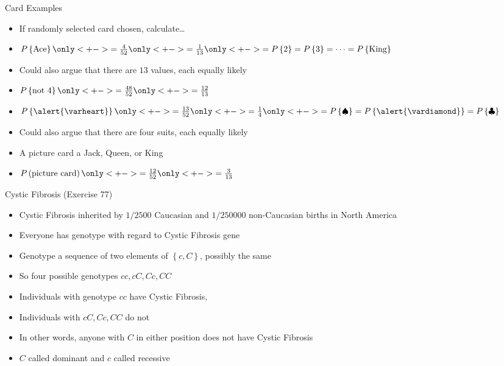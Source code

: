 \documentclass[handout]{beamer}
\theoremstyle{definition}
\begin{document}
\begin{frame}{Card Examples}
\begin{itemize}
\item If randomly selected card chosen, calculate\dots
\item $P\left\{\text{Ace}\right\}\only<+->{=\frac{4}{52}}
\only<+->{=\frac{1}{13}}
\only<+->{=P\left\{2\right\}=P\left\{3\right\}
=\cdots=P\left\{\text{King}\right\}}$
\item Could also argue that there are $13$ values, each equally likely
\item $P\left\{\text{not $4$}\right\}\only<+->{=\frac{48}{52}
\only<+->{=\frac{12}{13}}}$
\item $P\left\{\alert{\varheart}\right\}
\only<+->{=\frac{13}{52}}\only<+->{=\frac{1}{4}}
\only<+->{=P\left\{\spadesuit\right\}
=P\left\{\alert{\vardiamond}\right\}
=P\left\{\clubsuit\right\}}$
\item Could also argue that there are four suits, each equally likely
\item A \alert{picture card} a Jack, Queen, or King
\item $P\left(\text{picture card}\right)
\only<+->{=\frac{12}{52}}
\only<+->{=\frac{3}{13}}$
\end{itemize}
\end{frame}

\begin{frame}{Cystic Fibrosis (Exercise 77)}
\begin{itemize}
\item Cystic Fibrosis inherited by $1/2500$ Caucasian
and $1/250000$ non-Caucasian births in North America
\item Everyone has \alert{genotype}
with regard to Cystic Fibrosis gene
\item \alert{Genotype} a sequence of two elements of
$\left\{c,C\right\}$, possibly the same
\item So four possible genotypes $cc,cC,Cc,CC$
\item Individuals with genotype $cc$ \alert{have} Cystic Fibrosis,
\item Individuals with $cC,Cc,CC$ do \alert{not}
\item In other words, anyone with $C$ in either position
does \alert{not} have Cystic Fibrosis
\item $C$ called \alert{dominant} and $c$ called \alert{recessive}
\end{itemize}
\end{frame}
\end{document}

